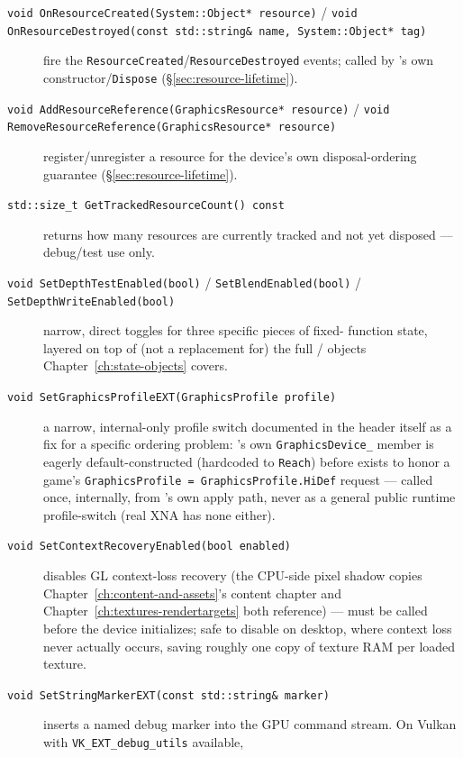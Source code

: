 \begin{description}
\item[\texttt{void OnResourceCreated(System::Object* resource)} /
  \texttt{void OnResourceDestroyed(const std::string\& name, System::Object* tag)}] fire the
  \texttt{ResourceCreated}/\texttt{ResourceDestroyed} events; called by
  's own constructor/\texttt{Dispose} (\S\ref{sec:resource-lifetime}).
\item[\texttt{void AddResourceReference(GraphicsResource* resource)} /
  \texttt{void RemoveResourceReference(GraphicsResource* resource)}] register/unregister a
  resource for the device's own disposal-ordering guarantee (\S\ref{sec:resource-lifetime}).
\item[\texttt{std::size\_t GetTrackedResourceCount() const}] returns how many resources are
  currently tracked and not yet disposed --- debug/test use only.
\item[\texttt{void SetDepthTestEnabled(bool)} / \texttt{SetBlendEnabled(bool)} /
  \texttt{SetDepthWriteEnabled(bool)}] narrow, direct toggles for three specific pieces of fixed-
  function state, layered on top of (not a replacement for) the full /
   objects Chapter~\ref{ch:state-objects} covers.
\item[\texttt{void SetGraphicsProfileEXT(GraphicsProfile profile)}] a narrow, internal-only
  profile switch documented in the header itself as a fix for a specific ordering problem:
  's own \texttt{GraphicsDevice\_} member is eagerly default-constructed
  (hardcoded to \texttt{Reach}) before  exists to honor a game's
  \texttt{GraphicsProfile = GraphicsProfile.HiDef} request --- called once, internally, from
  's own apply path, never as a general public runtime
  profile-switch (real XNA has none either).
\item[\texttt{void SetContextRecoveryEnabled(bool enabled)}] disables GL context-loss recovery
  (the CPU-side pixel shadow copies Chapter~\ref{ch:content-and-assets}'s content chapter and
  Chapter~\ref{ch:textures-rendertargets} both reference) --- must be called before the device
  initializes; safe to disable on desktop, where context loss never actually occurs, saving
  roughly one copy of texture RAM per loaded texture.
\item[\texttt{void SetStringMarkerEXT(const std::string\& marker)}] inserts a named debug
  marker into the GPU command stream. On Vulkan with \texttt{VK\_EXT\_debug\_utils} available,

\end{description}
